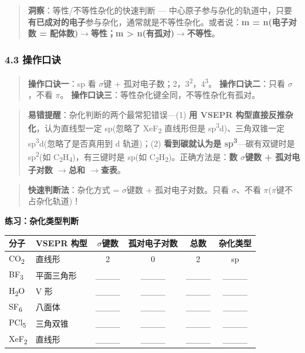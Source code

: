 \documentclass[a4paper,11pt]{ctexart}
\newcounter{none}
\newcommand{\箭}{\ensuremath{\rightarrow}}
\newcommand{\左箭}{\ensuremath{\leftarrow}}
\newcommand{\上箭}{\ensuremath{\uparrow}}
\newcommand{\下箭}{\ensuremath{\downarrow}}
\newcommand{\衡}{\ensuremath{\rightleftharpoons}}
\newcommand{\双箭}{\ensuremath{\leftrightarrow}}
\newcommand{\约等于}{\ensuremath{\approx}}
\newcommand{\小于等于}{\ensuremath{\leq}}
\newcommand{\大于等于}{\ensuremath{\geq}}
\newcommand{\不等于}{\ensuremath{\neq}}
\newcommand{\西格马}{\ensuremath{\sigma}}
\newcommand{\派}{\ensuremath{\pi}}
\begin{document}
\begin{quote}
\textbf{洞察}：等性/不等性杂化的快速判断 --- 中心原子参与杂化的轨道中，只要\textbf{有已成对的电子}参与杂化，通常就是不等性杂化。或者说：\textbf{m = n(电子对数 = 配体数)\箭 等性；m \textgreater{} n(有孤对)\箭 不等性}。
\end{quote}

\subsubsection{4.3 操作口诀}\label{ux64cdux4f5cux53e3ux8bc0}

\begin{quote}
\textbf{操作口诀一}：sp 看 \西格马 键 + 孤对电子数；2，3\textsuperscript{2}，4\textsuperscript{3}。
\textbf{操作口诀二}：只看 \西格马，不看 \派。
\textbf{操作口诀三}：等性杂化键全同，不等性杂化有孤对。
\end{quote}

\begin{quote}
\textbf{易错提醒}：杂化判断的两个最常犯错误---(1) \textbf{用 VSEPR 构型直接反推杂化}，认为直线型一定 sp(忽略了 XeF\textsubscript{2} 直线形但是 sp\textsuperscript{3}d)、三角双锥一定 sp\textsuperscript{3}d(忽略了是否真用到 d 轨道)；(2) \textbf{看到碳就认为是 sp\textsuperscript{3}}---碳有双键时是 sp\textsuperscript{2}(如 C\textsubscript{2}H\textsubscript{4})，有三键时是 sp(如 C\textsubscript{2}H\textsubscript{2})。正确方法是：\textbf{数 \西格马 键数 + 孤对电子对数 \箭 总和 \箭 查表}。
\end{quote}

\begin{quote}
\textbf{快速判断法}：杂化方式 = \西格马 键数 + 孤对电子对数。只看 \西格马、不看 \派(\派 键不占杂化轨道)！
\end{quote}

\textbf{练习：杂化类型判断}

{\def\LTcaptype{none} %
\begin{longtable}[]{@{}llcccc@{}}
\toprule\noalign{}
分子 & VSEPR 构型 & \西格马 键数 & 孤对电子对数 & 总数 & 杂化类型 \\
\midrule\noalign{}
\endhead
\bottomrule\noalign{}
\endlastfoot
CO\textsubscript{2} & 直线形 & 2 & 0 & 2 & sp \\
BF\textsubscript{3} & 平面三角形 & \_\_\_\_ & \_\_\_\_ & \_\_\_\_ & \_\_\_\_ \\
H\textsubscript{2}O & V 形 & \_\_\_\_ & \_\_\_\_ & \_\_\_\_ & \_\_\_\_ \\
SF\textsubscript{6} & 八面体 & \_\_\_\_ & \_\_\_\_ & \_\_\_\_ & \_\_\_\_ \\
PCl\textsubscript{5} & 三角双锥 & \_\_\_\_ & \_\_\_\_ & \_\_\_\_ & \_\_\_\_ \\
XeF\textsubscript{2} & 直线形 & \_\_\_\_ & \_\_\_\_ & \_\_\_\_ & \_\_\_\_ \\
\end{longtable}
}
\end{document}
